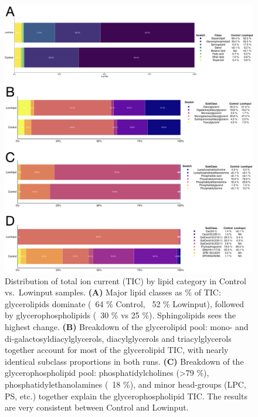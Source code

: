 \documentclass[10pt,letterpaper]{article}
\begin{document}
\begin{itemize}
\begin{figure}[htp]
  \centering
  \includegraphics[width=\textwidth]{fig/supp/SuppFig5.png}
  \caption{
    Distribution of total ion current (TIC) by lipid category in Control vs.\ Lowinput samples. 
    {\bf(A)} Major lipid classes as \% of TIC: glycerolipids dominate (~64 \% Control, ~52 \% Lowinput), followed by glycerophospholipids (~30 \% vs 25 \%). Sphingolipids sees the highest change.
    {\bf(B)} Breakdown of the glycerolipid pool: mono- and di-galactosyldiacylglycerols, diacylglycerols and triacylglycerols together account for most of the glycerolipid TIC, with nearly identical subclass proportions in both runs. 
    {\bf(C)} Breakdown of the glycerophospholipid pool: phosphatidylcholines (>79 \%), phosphatidylethanolamines (~18 \%), and minor head-groups (LPC, PS, etc.) together explain the glycerophospholipid TIC. The results are very consistent between Control and Lowinput.
  }
  \label{fig:S5}
\end{figure}




\end{itemize}
\end{document}
